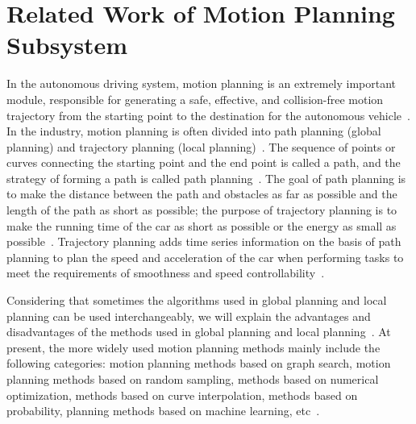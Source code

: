 \documentclass[conference]{IEEEtran}
\begin{document}
\section{Related Work of Motion Planning Subsystem}\label{sec:motion_planner}
In the autonomous driving system, motion planning is an extremely important module, responsible for generating a safe, effective, and collision-free motion trajectory from the starting point to the destination for the autonomous vehicle~\cite{gonzalez2015review}. In the industry, motion planning is often divided into path planning (global planning) and trajectory planning (local planning)~\cite{gonzalez2015review}. The sequence of points or curves connecting the starting point and the end point is called a path, and the strategy of forming a path is called path planning~\cite{gonzalez2015review}. The goal of path planning is to make the distance between the path and obstacles as far as possible and the length of the path as short as possible; the purpose of trajectory planning is to make the running time of the car as short as possible or the energy as small as possible~\cite{gonzalez2015review}. Trajectory planning adds time series information on the basis of path planning to plan the speed and acceleration of the car when performing tasks to meet the requirements of smoothness and speed controllability~\cite{gonzalez2015review}.

Considering that sometimes the algorithms used in global planning and local planning can be used interchangeably, we will explain the advantages and disadvantages of the methods used in global planning and local planning~\cite{Brian2016}. At present, the more widely used motion planning methods mainly include the following categories: motion planning methods based on graph search, motion planning methods based on random sampling, methods based on numerical optimization, methods based on curve interpolation, methods based on probability, planning methods based on machine learning, etc~\cite{Brian2016}.
\end{document}
